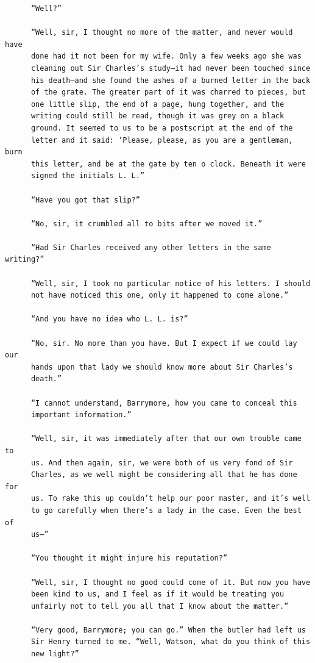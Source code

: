 \documentclass{article}
\begin{document}
\begin{verbatim}
      “Well?”

      “Well, sir, I thought no more of the matter, and never would have
      done had it not been for my wife. Only a few weeks ago she was
      cleaning out Sir Charles’s study—it had never been touched since
      his death—and she found the ashes of a burned letter in the back
      of the grate. The greater part of it was charred to pieces, but
      one little slip, the end of a page, hung together, and the
      writing could still be read, though it was grey on a black
      ground. It seemed to us to be a postscript at the end of the
      letter and it said: ‘Please, please, as you are a gentleman, burn
      this letter, and be at the gate by ten o clock. Beneath it were
      signed the initials L. L.”

      “Have you got that slip?”

      “No, sir, it crumbled all to bits after we moved it.”

      “Had Sir Charles received any other letters in the same writing?”

      “Well, sir, I took no particular notice of his letters. I should
      not have noticed this one, only it happened to come alone.”

      “And you have no idea who L. L. is?”

      “No, sir. No more than you have. But I expect if we could lay our
      hands upon that lady we should know more about Sir Charles’s
      death.”

      “I cannot understand, Barrymore, how you came to conceal this
      important information.”

      “Well, sir, it was immediately after that our own trouble came to
      us. And then again, sir, we were both of us very fond of Sir
      Charles, as we well might be considering all that he has done for
      us. To rake this up couldn’t help our poor master, and it’s well
      to go carefully when there’s a lady in the case. Even the best of
      us—”

      “You thought it might injure his reputation?”

      “Well, sir, I thought no good could come of it. But now you have
      been kind to us, and I feel as if it would be treating you
      unfairly not to tell you all that I know about the matter.”

      “Very good, Barrymore; you can go.” When the butler had left us
      Sir Henry turned to me. “Well, Watson, what do you think of this
      new light?”


\end{verbatim}
\end{document}
